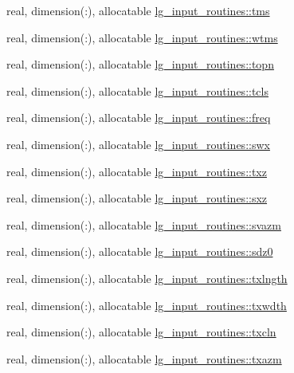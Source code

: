 \begin{DoxyCompactItemize}
\item 
real, dimension(\+:), allocatable \hyperlink{namespacelg__input__routines_a5568c5b399e14b491242b1b073be4b54}{lg\+\_\+input\+\_\+routines\+::tms}
\item 
real, dimension(\+:), allocatable \hyperlink{namespacelg__input__routines_a14a35edab0eb9da183da23d0efa95eba}{lg\+\_\+input\+\_\+routines\+::wtms}
\item 
real, dimension(\+:), allocatable \hyperlink{namespacelg__input__routines_aed3c58e52c5a1fda12def41c6995d7dd}{lg\+\_\+input\+\_\+routines\+::topn}
\item 
real, dimension(\+:), allocatable \hyperlink{namespacelg__input__routines_a634432267302a002552b9ca3feedb429}{lg\+\_\+input\+\_\+routines\+::tcls}
\item 
real, dimension(\+:), allocatable \hyperlink{namespacelg__input__routines_a2c092becc43cb2313a011cc8e3962349}{lg\+\_\+input\+\_\+routines\+::freq}
\item 
real, dimension(\+:), allocatable \hyperlink{namespacelg__input__routines_afe41d8f3c1483586b6ddc9f4d7193b46}{lg\+\_\+input\+\_\+routines\+::swx}
\item 
real, dimension(\+:), allocatable \hyperlink{namespacelg__input__routines_a1a991d972a51bc60707aadd4e0f5bcef}{lg\+\_\+input\+\_\+routines\+::txz}
\item 
real, dimension(\+:), allocatable \hyperlink{namespacelg__input__routines_a80924219ecce4e0ceb69bac59e6aefd4}{lg\+\_\+input\+\_\+routines\+::sxz}
\item 
real, dimension(\+:), allocatable \hyperlink{namespacelg__input__routines_ae702b8abf69e5b12bf96b026b2b112a8}{lg\+\_\+input\+\_\+routines\+::svazm}
\item 
real, dimension(\+:), allocatable \hyperlink{namespacelg__input__routines_a24da2d57446e220190d24b7ba6d7b050}{lg\+\_\+input\+\_\+routines\+::sdz0}
\item 
real, dimension(\+:), allocatable \hyperlink{namespacelg__input__routines_a607132f2ff751541dc97a344f7079627}{lg\+\_\+input\+\_\+routines\+::txlngth}
\item 
real, dimension(\+:), allocatable \hyperlink{namespacelg__input__routines_a4d1e58f6c9d49ef8c73f228edf7b9849}{lg\+\_\+input\+\_\+routines\+::txwdth}
\item 
real, dimension(\+:), allocatable \hyperlink{namespacelg__input__routines_a584f94cecae697219429638f0b6a2c0e}{lg\+\_\+input\+\_\+routines\+::txcln}
\item 
real, dimension(\+:), allocatable \hyperlink{namespacelg__input__routines_a05a79f826d1faa81e8e9840401be0982}{lg\+\_\+input\+\_\+routines\+::txazm}

\end{DoxyCompactItemize}
